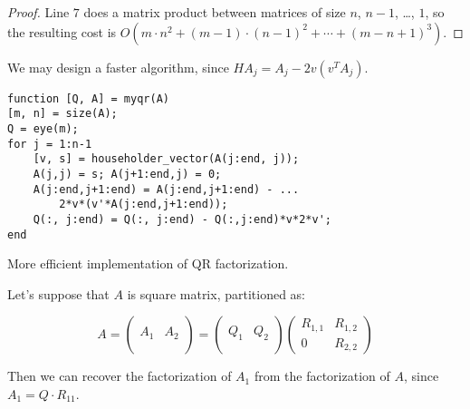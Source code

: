 \documentclass[ComputationalMathematics.tex]{subfiles}
\begin{document}
\begin{proof}
  Line $7$ does a matrix product between matrices of size $n$, $n-1$, \ldots, $1$, so the resulting cost is  $O(m \cdot n^{2} + {(m-1) \cdot (n-1)}^{2} + \cdots + {(m - n + 1)}^{3})$.

\end{proof}

We may design a faster algorithm, since $HA_j = A_j - 2v(v^T A_j)$.
\begin{center}
\begin{minipage}{.9\linewidth}
\begin{algorithm}[H]
\begin{verbatim}
function [Q, A] = myqr(A)
[m, n] = size(A);
Q = eye(m);
for j = 1:n-1
    [v, s] = householder_vector(A(j:end, j));
    A(j,j) = s; A(j+1:end,j) = 0;
    A(j:end,j+1:end) = A(j:end,j+1:end) - ...
        2*v*(v'*A(j:end,j+1:end));
    Q(:, j:end) = Q(:, j:end) - Q(:,j:end)*v*2*v';
end
\end{verbatim}
  \label{alg:26ottQR2}
\caption{More efficient implementation of QR factorization.}
\end{algorithm}
\end{minipage}
\end{center}

Let's suppose that $A$ is square matrix, partitioned as:

\[A = \begin{pmatrix}
    &\\
  A_{1} & A_{2}\\
  &\\
\end{pmatrix} =
 \begin{pmatrix}
   &\\
   Q_{1} & Q_{2}\\
   &\\
\end{pmatrix}
\begin{pmatrix}
  R_{1, 1} & R_{1,2}\\
  0 & R_{2,2}
  \end{pmatrix}
\]

Then we can recover the factorization of $A_{1}$ from the factorization of $A$, since $A_{1} = Q \cdot R_{11}$.
\end{document}
